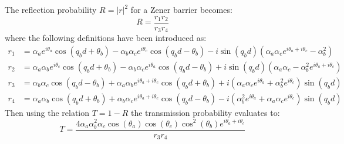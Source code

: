 		The reflection probability $R=|r|^{2}$ for a Zener barrier becomes:
		\begin{equation}
			R=\frac{r_{1}r_{2}}{r_{3}r_{4}}
		\end{equation}
		where the following definitions have been introduced as:
		\begin{align}
			r_{1}&=\alpha_{a}e^{i\theta_{a}}\cos(q_{b}d+\theta_{b})-\alpha_{b}\alpha_{c}e^{i\theta_{c}}\cos(q_{b}d-\theta_{b})-i\sin(q_{b}d)\left(\alpha_{a}\alpha_{c}e^{i\theta_{a}+i\theta_{c}}-\alpha_{b}^{2}\right)
			\\
			r_{2}&=\alpha_{a}\alpha_{b}e^{i\theta_{c}}\cos(q_{b}d+\theta_{b})-\alpha_{b}\alpha_{c}e^{i\theta_{a}}\cos(q_{b}d-\theta_{b})+i\sin(q_{b}d)\left(\alpha_{a}\alpha_{c}-\alpha_{b}^{2}e^{i\theta_{a}+i\theta_{c}}\right)
			\\
			r_{3}&=\alpha_{b}\alpha_{c}\cos(q_{b}d-\theta_{b})+\alpha_{a}\alpha_{b}e^{i\theta_{a}+i\theta_{c}}\cos(q_{b}d+\theta_{b})+i\left(\alpha_{a}\alpha_{c}e^{i\theta_{a}}+\alpha_{b}^{2}e^{i\theta_{c}}\right)\sin(q_{b}d)
			\\
			r_{4}&=\alpha_{a}\alpha_{b}\cos(q_{b}d+\theta_{b})+\alpha_{b}\alpha_{c}e^{i\theta_{a}+i\theta_{c}}\cos(q_{b}d-\theta_{b})-i\left(\alpha_{b}^{2}e^{i\theta_{a}}+\alpha_{a}\alpha_{c}e^{i\theta_{c}}\right)\sin(q_{b}d)
		\end{align}
		Then using the relation $T=1-R$ the transmission probability evaluates to:
		\begin{equation}
			T=\frac{4\alpha_{a}\alpha_{b}^{2}\alpha_{c}\cos(\theta_{a})\cos(\theta_{c})\cos^{2}(\theta_{b})e^{i\theta_{a}+i\theta_{c}}}{r_{3}r_{4}}
			\label{asy-t}
		\end{equation}


